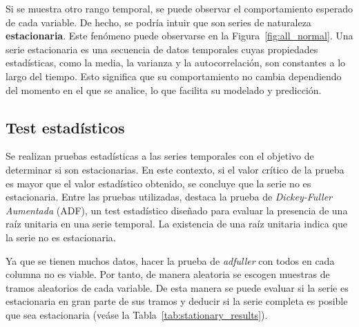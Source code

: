 \documentclass[12pt,letterpaper]{article}
\begin{document}
Si se muestra otro rango temporal, se puede observar el comportamiento esperado de cada variable. De hecho, se podría intuir que son series de naturaleza \textbf{estacionaria}. Este fenómeno puede observarse en la Figura~\ref{fig:all_normal}.
Una serie estacionaria es una secuencia de datos temporales cuyas propiedades estadísticas, como la media, la varianza y la autocorrelación, son constantes a lo largo del tiempo. Esto significa que su comportamiento no cambia dependiendo del momento en el que se analice, lo que facilita su modelado y predicción.

\subsection{Test estadísticos}
Se realizan pruebas estadísticas a las series temporales con el objetivo de determinar si son estacionarias. En este contexto, si el valor crítico de la prueba es mayor que el valor estadístico obtenido, se concluye que la serie no es estacionaria.
Entre las pruebas utilizadas, destaca la prueba de \textit{Dickey-Fuller Aumentada} (ADF), un test estadístico diseñado para evaluar la presencia de una raíz unitaria en una serie temporal. La existencia de una raíz unitaria indica que la serie no es estacionaria.

Ya que se tienen muchos datos, hacer la prueba de \textit{adfuller} con todos en cada columna no es viable. Por tanto, de manera aleatoria se escogen muestras de tramos aleatorios de cada variable. De esta manera se puede evaluar si la serie es estacionaria en gran parte de sus tramos y deducir si la serie completa es posible que sea estacionaria (veáse la Tabla~\ref{tab:stationary_results}).
\end{document}
